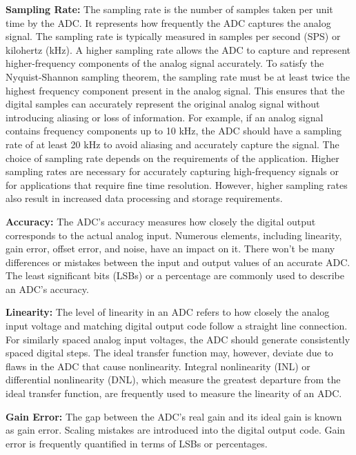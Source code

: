 \vspace{1\baselineskip}\par 
\textbf{Sampling Rate:} The sampling rate is the number of samples taken per unit time by the ADC. It represents how frequently the ADC captures the analog signal. The sampling rate is typically measured in samples per second (SPS) or kilohertz (kHz). A higher sampling rate allows the ADC to capture and represent higher-frequency components of the analog signal accurately. To satisfy the Nyquist-Shannon sampling theorem, the sampling rate must be at least twice the highest frequency component present in the analog signal. This ensures that the digital samples can accurately represent the original analog signal without introducing aliasing or loss of information. For example, if an analog signal contains frequency components up to 10 kHz, the ADC should have a sampling rate of at least 20 kHz to avoid aliasing and accurately capture the signal. The choice of sampling rate depends on the requirements of the application. Higher sampling rates are necessary for accurately capturing high-frequency signals or for applications that require fine time resolution. However, higher sampling rates also result in increased data processing and storage requirements.

\vspace{1\baselineskip}\par 
\textbf{Accuracy:} The ADC's accuracy measures how closely the digital output corresponds to the actual analog input. Numerous elements, including linearity, gain error, offset error, and noise, have an impact on it. There won't be many differences or mistakes between the input and output values of an accurate ADC. The least significant bits (LSBs) or a percentage are commonly used to describe an ADC's accuracy.

\vspace{1\baselineskip}\par 
\textbf{Linearity:} The level of linearity in an ADC refers to how closely the analog input voltage and matching digital output code follow a straight line connection. For similarly spaced analog input voltages, the ADC should generate consistently spaced digital steps. The ideal transfer function may, however, deviate due to flaws in the ADC that cause nonlinearity. Integral nonlinearity (INL) or differential nonlinearity (DNL), which measure the greatest departure from the ideal transfer function, are frequently used to measure the linearity of an ADC.

\vspace{1\baselineskip}\par 
\textbf{Gain Error:} The gap between the ADC's real gain and its ideal gain is known as gain error. Scaling mistakes are introduced into the digital output code. Gain error is frequently quantified in terms of LSBs or percentages.


